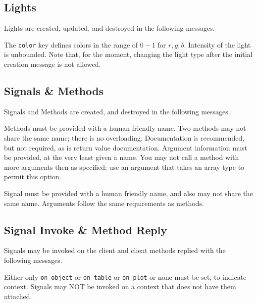 \documentclass[11pt, oneside]{amsart}
\begin{document}
\subsection{Lights}

 Lights are created, updated, and destroyed in the following messages.

 

 The \texttt{color} key defines colors in the range of $0 - 1$ for $r,g,b$. Intensity of the light is unbounded. Note that, for the moment, changing the light type after the initial creation message is not allowed.


\subsection{Signals \& Methods}

Signals and Methods are created, and destroyed in the following messages.



Methods must be provided with a human friendly name. Two methods may not share the same name; there is no overloading. Documentation is recommended, but not required, as is return value documentation. Argument information must be provided, at the very least given a name. You may not call a method with more arguments then as specified; use an argument that takes an array type to permit this option.

Signal must be provided with a human friendly name, and also may not share the same name. Arguments follow the same requirements as methods.

\subsection{Signal Invoke \& Method Reply}

Signals may be invoked on the client and client methods replied with the following messages.



Either only \texttt{on\_object} or \texttt{on\_table} or \texttt{on\_plot} or none must be set, to indicate context. Signals may NOT be invoked on a context that does not have them attached.
\end{document}
